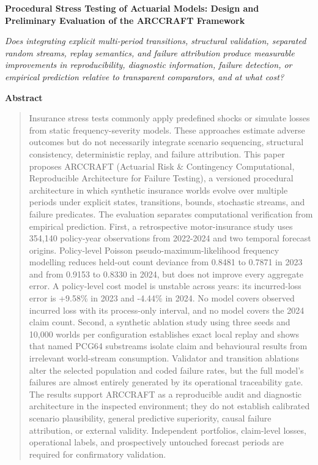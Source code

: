 \documentclass[12pt, letterpaper]{article}
\numberwithin{equation}{section}
\theoremstyle{plain}
\theoremstyle{definition}
\theoremstyle{remark}
\begin{document}
\thispagestyle{empty}
\vspace*{1.5cm}
{\centering
{\Large\bfseries Procedural Stress Testing of Actuarial Models: Design and Preliminary Evaluation of the ARCCRAFT Framework}\par
\vspace{0.5em}
{\large\itshape Does integrating explicit multi-period transitions, structural validation, separated random streams, replay semantics, and failure attribution produce measurable improvements in reproducibility, diagnostic information, failure detection, or empirical prediction relative to transparent comparators, and at what cost?}\par
\par}
\vspace{1.8cm}
\begin{center}
\textbf{Abstract}
\end{center}
\begin{quote}
\small
Insurance stress tests commonly apply predefined shocks or simulate losses from static frequency-severity models. These approaches estimate adverse outcomes but do not necessarily integrate scenario sequencing, structural consistency, deterministic replay, and failure attribution. This paper proposes ARCCRAFT (Actuarial Risk \& Contingency Computational, Reproducible Architecture for Failure Testing), a versioned procedural architecture in which synthetic insurance worlds evolve over multiple periods under explicit states, transitions, bounds, stochastic streams, and failure predicates. The evaluation separates computational verification from empirical prediction. First, a retrospective motor-insurance study uses 354,140 policy-year observations from 2022-2024 and two temporal forecast origins. Policy-level Poisson pseudo-maximum-likelihood frequency modelling reduces held-out count deviance from 0.8481 to 0.7871 in 2023 and from 0.9153 to 0.8330 in 2024, but does not improve every aggregate error. A policy-level cost model is unstable across years: its incurred-loss error is +9.58\% in 2023 and -4.44\% in 2024. No model covers observed incurred loss with its process-only interval, and no model covers the 2024 claim count. Second, a synthetic ablation study using three seeds and 10,000 worlds per configuration establishes exact local replay and shows that named PCG64 substreams isolate claim and behavioural results from irrelevant world-stream consumption. Validator and transition ablations alter the selected population and coded failure rates, but the full model’s failures are almost entirely generated by its operational traceability gate. The results support ARCCRAFT as a reproducible audit and diagnostic architecture in the inspected environment; they do not establish calibrated scenario plausibility, general predictive superiority, causal failure attribution, or external validity. Independent portfolios, claim-level losses, operational labels, and prospectively untouched forecast periods are required for confirmatory validation.
\end{quote}
\end{document}
